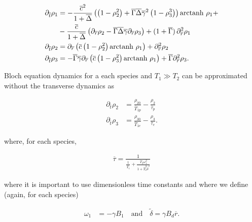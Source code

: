 \documentclass[%
oneside,                 %
final,                   %
10pt]{article}
\begin{document}
\begin{align} 
	\partial_{\overline{t}} \rho_1 
	&=
	-\frac{\overline{c}^2}{1+\overline{\Delta}}
	\left(
		\left(
			1 - \rho_2^2
		\right)
		+
		\overline{\Gamma}\overline{\Delta}\overline{\gamma}^2
		\left(
			1 - \rho_3^3
		\right)
	\right)
	\text{arctanh }\rho_1 + 
	\nonumber\\
	&-\frac{\overline{c}}{1+\overline{\Delta}}
	\left(
		\partial_{\overline{r}} \rho_2 - \overline{\Gamma}\overline{\Delta}\overline{\gamma} \partial_{\overline{r}} \rho_3
	\right)
	+ ( 1 + \overline{\Gamma} )\, \partial_{\overline{r}}^2 \rho_1 \\
	\partial_{\overline{t}} \rho_2 
	&=
	\partial_{\overline{r}}
	\left(
		\overline{c}
		\left( 1 - \rho_2^2 \right)
		\text{arctanh }\rho_1
	\right)
	+ \partial_{\overline{r}}^2 \rho_2 \\
	\partial_{\overline{t}} \rho_3
	&=
	- 
	\overline{\Gamma}\overline{\gamma}
	\partial_{\overline{r}}
	\left(
		\overline{c}
		\left( 1 - \rho_3^2 \right)
		\text{arctanh }\rho_1
	\right)
	+ \overline{\Gamma} \partial_{\overline{r}}^2 \rho_3 .
\end{align}

Bloch equation dynamics for a each species and $T_1 \gg T_2$ can be approximated without the transverse dynamics as \cite{Picone2010,Grivet1993}

\begin{align}
	\partial_{\overline{t}} \rho_2 &= \frac{\rho_{20}}{\overline{T}_{1p}} - \frac{\rho_2}{\overline{\tau}_p} \\
	\partial_{\overline{t}} \rho_3 &= \frac{\rho_{30}}{\overline{T}_{1e}} - \frac{\rho_3}{\overline{\tau}_e}.
\end{align}

where, for each species,

\begin{align}
	\overline{\tau} = \frac{1}{\frac{1}{\overline{T}_1} + \frac{\overline{T}_2 \omega_1^2}{1+\overline{T}_2^2 \tilde{\delta}^2}}
\end{align}

where it is important to use dimensionless time constants and where we define (again, for each species)

\begin{align}
	\omega_1 &= -\gamma B_1 \quad \text{and} \quad
	\tilde{\delta} = \gamma B_d \overline{r}.
\end{align}









\end{document}
